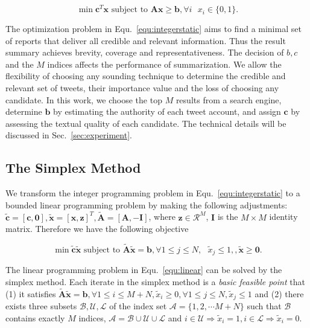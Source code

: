 \documentclass[envcountsame]{llncs}
\begin{document}
\vspace{-0.3cm}
\begin{equation}\label{equ:integerstatic}
\min \mathbf{c}^T \mathbf{x} \textrm{ subject to } \mathbf{A} \mathbf{x} \geq \mathbf{b}, \forall i\textrm{ } x_i\in \{0,1\}.
\end{equation}
\vspace{-0.6cm}

The optimization problem in Equ.~\ref{equ:integerstatic} aims to find a minimal set of reports that deliver all credible and relevant information. Thus the result summary achieves brevity, coverage and representativeness. The decision of $b,c$ and the $M$ indices affects the performance of summarization. We allow the flexibility of choosing any sounding technique to determine the credible and relevant set of tweets, their importance value and the loss of choosing any candidate. In this work,  we  choose the top $M$ results from a search engine, determine $\mathbf{b}$  by estimating  the authority of each tweet account, and assign $\mathbf{c}$ by assessing the textual quality of each candidate. The technical details will be discussed in Sec.~\ref{sec:experiment}.

\subsection{The Simplex Method}
We transform the integer programming problem in Equ.~\ref{equ:integerstatic} to a bounded linear programming problem by making the following adjustments: $\tilde{\mathbf{c}}=[\mathbf{c},\mathbf{0}],\tilde{\mathbf{x}}=[\mathbf{x},\mathbf{z}]^T,\tilde{\mathbf{A}}=[\mathbf{A},-\mathbf{I}]$, where $\mathbf{z}\in\mathcal{R}^M$, $ \mathbf{I}$ is the $M\times M$ identity matrix. Therefore we have the following objective

\vspace{-0.3cm}
\begin{equation}\label{equ:linear}
\min \tilde{\mathbf{c}}\tilde{\mathbf{x}}\textrm{ subject to } \tilde{\mathbf{A}}\tilde{\mathbf{x}} = \mathbf{b}, \forall 1\leq j\leq N,\textrm{ } \tilde{x}_j \leq 1, ,\tilde{\mathbf{x}}\geq \mathbf{0}.
\end{equation}
\vspace{-0.6cm}

The linear programming problem in Equ.~\ref{equ:linear} can be solved by the simplex method. Each iterate in the simplex method is a \emph{basic feasible point} that (1) it satisfies $\tilde{\mathbf{A}}\tilde{\mathbf{x}} = \mathbf{b}, \forall 1\leq i\leq M+N,\tilde{x}_i \geq 0,\forall 1\leq j\leq N, \tilde{x}_j \leq 1$ and (2) there exists three subsets $\mathcal{B,U,L}$ of the index set $\mathcal{A}=\{1,2,\cdots M+N\}$ such that $\mathcal{B}$ contains exactly $M$ indices, $\mathcal{A}=\mathcal{B}\cup \mathcal{U} \cup \mathcal{L}$ and $i \in \mathcal{U} \Rightarrow \tilde{x}_i=1,i \in \mathcal{L} \Rightarrow \tilde{x}_i=0$.
\end{document}
